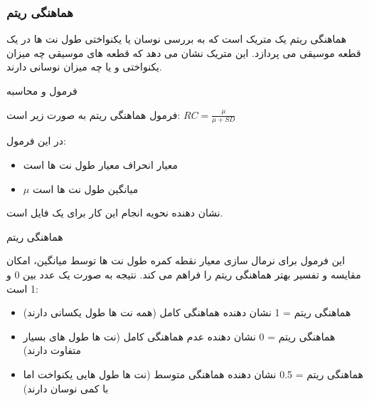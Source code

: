 \subsubsection{هماهنگی ریتم }

هماهنگی ریتم یک متریک است که به بررسی نوسان یا یکنواختی طول نت ها در یک قطعه موسیقی می پردازد. این متریک نشان می دهد که قطعه های موسیقی چه میزان یکنواختی و یا چه میزان نوسانی دارند.

فرمول و محاسبه

فرمول هماهنگی ریتم به صورت زیر است:
\begin{math}
      RC =  \frac{\mu}{\mu + SD}
\end{math}

در این فرمول:
\begin{itemize}
      \item  {} معیار انحراف معیار طول نت ها است
      \item  ${\mu}$ میانگین طول نت ها است
\end{itemize}

 نشان دهنده نحویه انجام این کار برای یک فایل  است.

\begin{LTR}
      \begin{algorithm}
            \caption{هماهنگی ریتم}
            \setmainfont{Times New Roman}
            \label{alg:analyze_rhythm_consistency}
            \begin{algorithmic}
            \end{algorithmic}
      \end{algorithm}
\end{LTR}

این فرمول برای نرمال سازی معیار نقطه کمره طول نت ها توسط میانگین، امکان مقایسه و تفسیر بهتر هماهنگی ریتم را فراهم می کند. نتیجه به صورت یک عدد بین 0 و 1 است:

\begin{itemize}
      \item هماهنگی ریتم = 1 نشان دهنده هماهنگی کامل (همه نت ها طول یکسانی دارند)
      \item هماهنگی ریتم = 0 نشان دهنده عدم هماهنگی کامل (نت ها طول های بسیار متفاوت دارند)
      \item هماهنگی ریتم = 0.5 نشان دهنده هماهنگی متوسط (نت ها طول هایی یکنواخت اما با کمی نوسان دارند)
\end{itemize}

